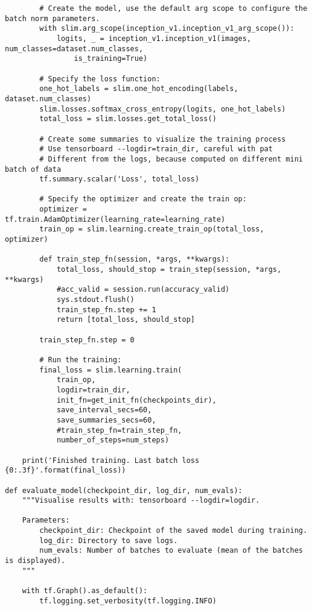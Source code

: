 \begin{lstlisting}
        # Create the model, use the default arg scope to configure the batch norm parameters.
        with slim.arg_scope(inception_v1.inception_v1_arg_scope()):
            logits, _ = inception_v1.inception_v1(images, num_classes=dataset.num_classes, 
                is_training=True)
            
        # Specify the loss function:
        one_hot_labels = slim.one_hot_encoding(labels, dataset.num_classes)
        slim.losses.softmax_cross_entropy(logits, one_hot_labels)
        total_loss = slim.losses.get_total_loss()

        # Create some summaries to visualize the training process
        # Use tensorboard --logdir=train_dir, careful with pat
        # Different from the logs, because computed on different mini batch of data
        tf.summary.scalar('Loss', total_loss)
      
        # Specify the optimizer and create the train op:
        optimizer = tf.train.AdamOptimizer(learning_rate=learning_rate)
        train_op = slim.learning.create_train_op(total_loss, optimizer)

        def train_step_fn(session, *args, **kwargs):
            total_loss, should_stop = train_step(session, *args, **kwargs)
            #acc_valid = session.run(accuracy_valid)
            sys.stdout.flush()
            train_step_fn.step += 1
            return [total_loss, should_stop]
        
        train_step_fn.step = 0

        # Run the training:
        final_loss = slim.learning.train(
            train_op,
            logdir=train_dir,
            init_fn=get_init_fn(checkpoints_dir),
            save_interval_secs=60,
            save_summaries_secs=60,
            #train_step_fn=train_step_fn,
            number_of_steps=num_steps)
            
    print('Finished training. Last batch loss {0:.3f}'.format(final_loss))

def evaluate_model(checkpoint_dir, log_dir, num_evals):
    """Visualise results with: tensorboard --logdir=logdir.
    
    Parameters:
        checkpoint_dir: Checkpoint of the saved model during training.
        log_dir: Directory to save logs.
        num_evals: Number of batches to evaluate (mean of the batches is displayed).
    """
    
    with tf.Graph().as_default():
        tf.logging.set_verbosity(tf.logging.INFO)


\end{lstlisting}
